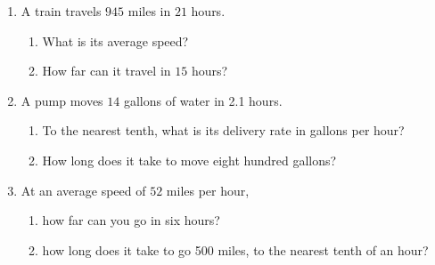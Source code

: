 \documentclass[12pt]{article}
\begin{document}
\begin{enumerate}
\item A train travels $945$ miles in $21$ hours. 
	\begin{enumerate}
		\item What is its average speed? 
\spacing

		\item How far can it travel in $15$ hours? 
\spacing
	\end{enumerate}

\item A pump moves $14$ gallons of water in 2.1 hours.   
	\begin{enumerate}
		\item To the nearest tenth, what is its delivery rate in gallons per hour?  
\spacing

		\item How long does it take to move eight hundred gallons? 
\spacing
	\end{enumerate}

\item At an average speed of $52$ miles per hour, 
	\begin{enumerate}
		\item how far can you go in six hours?  
\spacing

		\item how long does it take to go 500 miles, to the nearest tenth of an hour? 
\spacing
	\end{enumerate}

\end{enumerate}
\end{document}
